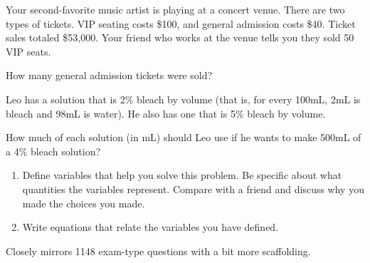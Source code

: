 \documentclass[noauthor]{ximera}
\begin{document}
\begin{problem}
Your second-favorite music artist is playing at a concert venue. There are two types of tickets. VIP seating costs \$100, and general admission costs \$40. 
Ticket sales totaled \$53,000. Your friend who works at the venue tells you they sold 50 VIP seats.

How many general admission tickets were sold?
\end{problem}


\begin{problem}
Leo has a solution that is 2\% bleach by volume (that is, for every 100mL, 2mL is bleach and 98mL is water). He also has one that is 5\% bleach by volume. 

How much of each solution (in mL) should Leo use if he wants to make 500mL of a 4\% bleach solution?

\begin{enumerate}
    \item Define variables that help you solve this 
    problem. Be specific about what quantities the variables
    represent. Compare with a friend and discuss why you made 
    the choices you made.
    \item Write equations that relate the variables you 
    have defined.
\end{enumerate}



\begin{instructorNotes}
Closely mirrors 1148 exam-type questions with a bit more scaffolding.
\end{instructorNotes}
\end{problem}
\end{document}
